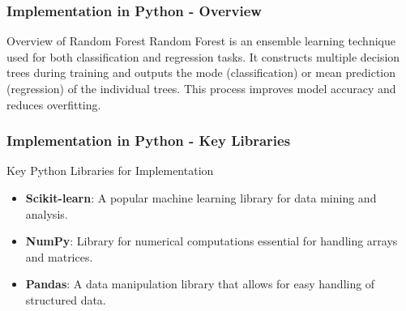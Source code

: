\documentclass[aspectratio=169]{beamer}
\begin{document}
\begin{frame}[fragile]
    \frametitle{Implementation in Python - Overview}
    \begin{block}{Overview of Random Forest}
        Random Forest is an ensemble learning technique used for both classification and regression tasks. 
        It constructs multiple decision trees during training and outputs the mode (classification) or mean prediction (regression) of the individual trees. This process improves model accuracy and reduces overfitting.
    \end{block}
\end{frame}

\begin{frame}[fragile]
    \frametitle{Implementation in Python - Key Libraries}
    \begin{block}{Key Python Libraries for Implementation}
        \begin{itemize}
            \item \textbf{Scikit-learn}: A popular machine learning library for data mining and analysis.
            \item \textbf{NumPy}: Library for numerical computations essential for handling arrays and matrices.
            \item \textbf{Pandas}: A data manipulation library that allows for easy handling of structured data.
        \end{itemize}
    \end{block}
\end{frame}
\end{document}
